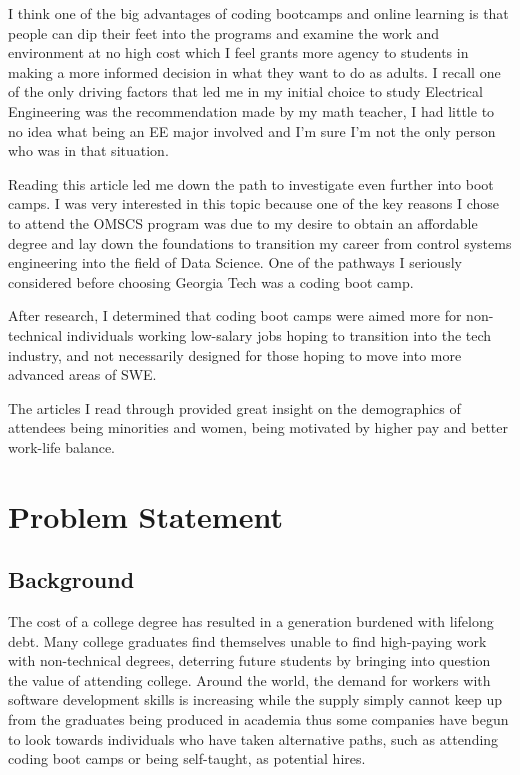 \documentclass[
	letterpaper, %
]{jdf}
\begin{document}
I think one of the big advantages of coding bootcamps and online learning is that people can dip their feet into the programs and examine the work and environment at no high cost which I feel grants more agency to students in making a more informed decision in what they want to do as adults. I recall one of the only driving factors that led me in my initial choice to study Electrical Engineering was the recommendation made by my math teacher, I had little to no idea what being an EE major involved and I'm sure I'm not the only person who was in that situation.

Reading this article led me down the path to investigate even further into boot camps. I was very interested in this topic because one of the key reasons I chose to attend the OMSCS program was due to my desire to obtain an affordable degree and lay down the foundations to transition my career from control systems engineering into the field of Data Science. One of the pathways I seriously considered before choosing Georgia Tech was a coding boot camp. 

After research, I determined that coding boot camps were aimed more for non-technical individuals working low-salary jobs hoping to transition into the tech industry, and not necessarily designed for those hoping to move into more advanced areas of SWE. 

The articles I read through provided great insight on the demographics of attendees being minorities and women, being motivated by higher pay and better work-life balance. \citep{7} \citep{9} \citep{10} \citep{11} \citep{12} \cite{13} \cite{14}

\section{Problem Statement}

\subsection{Background}
The cost of a college degree has resulted in a generation burdened with lifelong debt. Many college graduates find themselves unable to find high-paying work with non-technical degrees, deterring future students by bringing into question the value of attending college. Around the world, the demand for workers with software development skills is increasing while the supply simply cannot keep up from the graduates being produced in academia thus some companies have begun to look towards individuals who have taken alternative paths, such as attending coding boot camps or being self-taught, as potential hires. 
\end{document}
